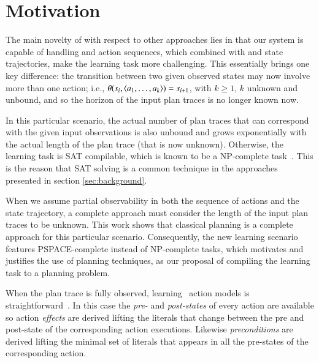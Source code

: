 
\section{Motivation}
\label{sec:motivation}

The main novelty of \FAMA with respect to other approaches lies in that our system is capable of handling \PO and \NO action sequences, which combined with \PO and \NO state trajectories, make the learning task more challenging. This essentially brings one key difference: the transition between two given observed states may now involve more than one action; i.e., $\theta(s_i,{\langle a_1,\ldots,a_k \rangle})=s_{i+1}$, with $k \geq 1$, $k$ unknown and unbound, and so the horizon of the input plan traces is no longer known now.

In this particular scenario, the actual number of plan traces that can correspond with the given input observations is also unbound and grows exponentially with the actual length of the plan trace (that is now unknown). Otherwise, the learning task is SAT compilable, which is known to be a NP-complete task~\cite{russell2016artificial}. This is the reason that SAT solving is a common technique in the approaches presented in section \ref{sec:background}.

When we assume partial observability in both the sequence of actions and the state trajectory, a complete approach must consider the length of the input plan traces to be unknown. This work shows that classical planning is a complete approach for this particular scenario. Consequently, the new learning scenario features PSPACE-complete instead of NP-complete tasks, which motivates and justifies the use of planning techniques, as our proposal of compiling the learning task to a planning problem.

When the plan trace is fully observed, learning \strips\ action models is straightforward~\cite{jimenez2012review}. In this case the {\em pre-} and {\em post-states} of every action are available so action {\em effects} are derived lifting the literals that change between the pre and post-state of the corresponding action executions. Likewise {\em preconditions} are derived lifting the minimal set of literals that appears in all the pre-states of the corresponding action.



